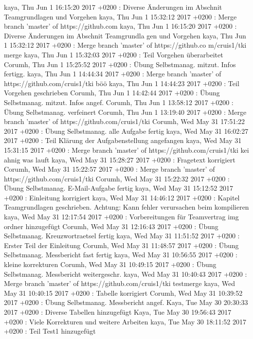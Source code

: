 
kaya, Thu Jun 1 16:15:20 2017 +0200 : Diverse Änderungen im Abschnit Teamgrundlagen und Vorgehen
kaya, Thu Jun 1 15:32:12 2017 +0200 : Merge branch 'master' of https://github.com
kaya, Thu Jun 1 16:15:20 2017 +0200 : Diverse Änderungen im Abschnit Teamgrundla
gen und Vorgehen
kaya, Thu Jun 1 15:32:12 2017 +0200 : Merge branch 'master' of https://github.co
m/cruis1/tki merge
kaya, Thu Jun 1 15:32:03 2017 +0200 : Teil Vorgehen überarbeitet
Corumh, Thu Jun 1 15:25:52 2017 +0200 : Übung Selbstmanag. mitzut. Infos fertigg.
kaya, Thu Jun 1 14:44:34 2017 +0200 : Merge branch 'master' of https://github.com/cruis1/tki böö
kaya, Thu Jun 1 14:44:23 2017 +0200 : Teil Vorgehen geschrieben
Corumh, Thu Jun 1 14:42:44 2017 +0200 : Übung Selbstmanag. mitzut. Infos angef.
Corumh, Thu Jun 1 13:58:12 2017 +0200 : Übung Selbstmanag. verfeinert
Corumh, Thu Jun 1 13:19:40 2017 +0200 : Merge branch 'master' of https://github.com/cruis1/tki
Corumh, Wed May 31 17:51:22 2017 +0200 : Übung Selbstmanag. alle Aufgabe fertig
kaya, Wed May 31 16:02:27 2017 +0200 : Teil Klärung der Aufgabenstellung angefangen
kaya, Wed May 31 15:31:15 2017 +0200 : Merge branch 'master' of https://github.com/cruis1/tki kei ahnig was lauft
kaya, Wed May 31 15:28:27 2017 +0200 : Fragetext korrigiert
Corumh, Wed May 31 15:22:57 2017 +0200 : Merge branch 'master' of https://github.com/cruis1/tki
Corumh, Wed May 31 15:22:32 2017 +0200 : Übung Selbstmanag. E-Mail-Aufgabe fertig
kaya, Wed May 31 15:12:52 2017 +0200 : Einleitung korrigiert
kaya, Wed May 31 14:46:12 2017 +0200 : Kapitel Teamgrundlagen geschrieben. Achtung: Kann fehler verursachen beim kompilieren
kaya, Wed May 31 12:17:54 2017 +0200 : Vorbereitungen für Teamvertrag img ordner hinzugefügt
Corumh, Wed May 31 12:16:43 2017 +0200 : Übung Selbstmanag. Kreuzwortraetsel fertig
kaya, Wed May 31 11:51:52 2017 +0200 : Erster Teil der Einleitung
Corumh, Wed May 31 11:48:57 2017 +0200 : Übung Selbstmanag. Messbericht fast fertig
kaya, Wed May 31 10:56:55 2017 +0200 : kleine korrekturen
Corumh, Wed May 31 10:49:15 2017 +0200 : Übung Selbstmanag. Messbericht weitergeschr.
kaya, Wed May 31 10:40:43 2017 +0200 : Merge branch 'master' of https://github.com/cruis1/tki testmerge
kaya, Wed May 31 10:40:15 2017 +0200 : Tabelle korrigiert
Corumh, Wed May 31 10:39:52 2017 +0200 : Übung Selbstmanag. Messbericht angef.
Kaya, Tue May 30 20:30:33 2017 +0200 : Diverse Tabellen hinzugefügt
Kaya, Tue May 30 19:56:43 2017 +0200 : Viele Korrekturen und weitere Arbeiten
kaya, Tue May 30 18:11:52 2017 +0200 : Teil Test1 hinzugefügt
